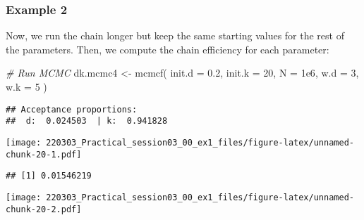 \documentclass[
]{article}
\newenvironment{Shaded}{\begin{snugshade}}{\end{snugshade}}
\newcommand{\AttributeTok}[1]{\textcolor[rgb]{0.77,0.63,0.00}{#1}}
\newcommand{\CommentTok}[1]{\textcolor[rgb]{0.56,0.35,0.01}{\textit{#1}}}
\newcommand{\DecValTok}[1]{\textcolor[rgb]{0.00,0.00,0.81}{#1}}
\newcommand{\FloatTok}[1]{\textcolor[rgb]{0.00,0.00,0.81}{#1}}
\newcommand{\FunctionTok}[1]{\textcolor[rgb]{0.00,0.00,0.00}{#1}}
\newcommand{\NormalTok}[1]{#1}
\newcommand{\OtherTok}[1]{\textcolor[rgb]{0.56,0.35,0.01}{#1}}
\newcommand{\SpecialCharTok}[1]{\textcolor[rgb]{0.00,0.00,0.00}{#1}}
\begin{document}
\hypertarget{example-2}{%
\subsubsection{Example 2}\label{example-2}}

Now, we run the chain longer but keep the same starting values for the
rest of the parameters. Then, we compute the chain efficiency for each
parameter:

\begin{Shaded}
\begin{Highlighting}[]
\CommentTok{\# Run MCMC}
\NormalTok{dk.mcmc4 }\OtherTok{\textless{}{-}} \FunctionTok{mcmcf}\NormalTok{( }\AttributeTok{init.d =} \FloatTok{0.2}\NormalTok{, }\AttributeTok{init.k =} \DecValTok{20}\NormalTok{, }\AttributeTok{N =} \FloatTok{1e6}\NormalTok{,}
                   \AttributeTok{w.d =} \DecValTok{3}\NormalTok{, }\AttributeTok{w.k =} \DecValTok{5}\NormalTok{ )}
\end{Highlighting}
\end{Shaded}

\begin{verbatim}
## Acceptance proportions:
##  d:  0.024503  | k:  0.941828
\end{verbatim}

\begin{Shaded}
\end{Shaded}

\texttt{[image: 220303\_Practical\_session03\_00\_ex1\_files/figure-latex/unnamed-chunk-20-1.pdf]}

\begin{verbatim}
## [1] 0.01546219
\end{verbatim}

\begin{Shaded}
\end{Shaded}

\texttt{[image: 220303\_Practical\_session03\_00\_ex1\_files/figure-latex/unnamed-chunk-20-2.pdf]}
\end{document}
